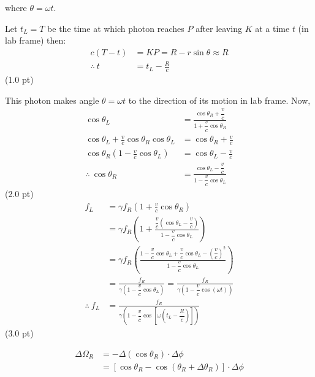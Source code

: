 \begin{description}
  where $\theta = \omega t$.

  Let $t_L = T$ be the time at which photon reaches $P$ after leaving $K$ at
  a time $t$ (in lab frame) then:
  \begin{align*}
    c(T - t) &= KP = R - r\sin\theta \approx R\\
    \therefore\ t &= t_L - \frac{R}{c}
  \end{align*}
  \hfill(1.0 pt)

  This photon makes angle $\theta = \omega t$ to the direction of its motion
  in lab frame. Now,
  \begin{align*}
    \cos\theta_L &= \frac{\cos\theta_R + \dfrac{v}{c}}
                        {1 + \dfrac{v}{c}\cos\theta_R}\\
    \cos\theta_L + \frac{v}{c}\cos\theta_R\cos\theta_L
      &= \cos\theta_R + \frac{v}{c}\\
    \cos\theta_R\left(1 - \frac{v}{c}\cos\theta_L\right)
      &= \cos\theta_L - \frac{v}{c}\\
    \therefore\ \cos\theta_R
      &= \frac{\cos\theta_L - \dfrac{v}{c}}
              {1 - \dfrac{v}{c}\cos\theta_L}
  \end{align*}
  \hfill(2.0 pt)
  \begin{align*}
    f_L &= \gamma f_R\left(1 + \frac{v}{c}\cos\theta_R\right)\\
    &= \gamma f_R\left(1 + \frac{\dfrac{v}{c}
        \left(\cos\theta_L - \dfrac{v}{c}\right)}
        {1 - \dfrac{v}{c}\cos\theta_L}\right)\\
    &= \gamma f_R\left(\frac{1 - \dfrac{v}{c}\cos\theta_L
        + \dfrac{v}{c}\cos\theta_L - \left(\dfrac{v}{c}\right)^2}
        {1 - \dfrac{v}{c}\cos\theta_L}\right)\\
    &= \frac{f_R}{\gamma\left(1 - \dfrac{v}{c}\cos\theta_L\right)}
     = \frac{f_R}{\gamma\left(1 - \dfrac{v}{c}\cos(\omega t)\right)}\\
    \therefore\ f_L
      &= \frac{f_R}{\gamma\left(1 - \dfrac{v}{c}
         \cos\left[\omega\left(t_L - \dfrac{R}{c}\right)\right]\right)}
  \end{align*}
  \hfill(3.0 pt)
\item[(d)] \hspace{0pt}
  \begin{align*}
    \Delta\Omega_R &= -\Delta(\cos\theta_R)\cdot\Delta\phi\\
    &= \left[\cos\theta_R - \cos(\theta_R + \Delta\theta_R)\right]
       \cdot\Delta\phi\\

\end{align*}
\end{description}
